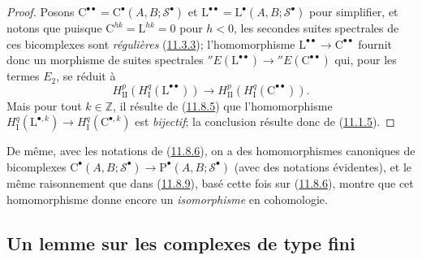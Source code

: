 \begin{proof}
Posons $\mathrm C^{\bullet\bullet}=
\mathrm C^\bullet(A,B;\mathscr S^\bullet)$ et
$\mathrm L^{\bullet\bullet}=
\mathrm L^\bullet(A,B;\mathscr S^\bullet)$ pour simplifier, et notons que
puisque $\mathrm C^{hk}=\mathrm L^{hk}=0$ pour $h<0$, les secondes suites
spectrales de ces bicomplexes sont \emph{régulières}
(\hyperref[0.11.3.3-fr]{11.3.3}); l'homomorphisme
$\mathrm L^{\bullet\bullet}\to\mathrm C^{\bullet\bullet}$ fournit donc un
morphisme de suites spectrales
${}''E(\mathrm L^{\bullet\bullet})\to
{}''E(\mathrm C^{\bullet\bullet})$
qui, pour les termes $E_2$, se réduit à
\[
\label{0.11.8.9.1-fr}
\tag{11.8.9.1}
H^p_{\mathrm{II}}(H^q_{\mathrm I}(\mathrm L^{\bullet\bullet}))
\longrightarrow
H^p_{\mathrm{II}}(H^q_{\mathrm I}(\mathrm C^{\bullet\bullet})).
\]
Mais pour tout $k\in\mathbb Z$, il résulte de
(\hyperref[0.11.8.5-fr]{11.8.5}) que l'homomorphisme
$H^q_{\mathrm I}(\mathrm L^{\bullet,k})\to
H^q_{\mathrm I}(\mathrm C^{\bullet,k})$ est \emph{bijectif}; la conclusion résulte
donc de (\hyperref[0.11.1.5-fr]{11.1.5}).
\end{proof}

\begin{env}[11.8.10]
\label{0.11.8.10-fr}
De même, avec les notations de (\hyperref[0.11.8.6-fr]{11.8.6}), on a des
homomorphismes canoniques de bicomplexes
$\mathrm C^\bullet(A,B;\mathscr S^\bullet)\to
\mathrm P^\bullet(A,B;\mathscr S^\bullet)$
(avec des notations évidentes), et le même raisonnement que dans
(\hyperref[0.11.8.9-fr]{11.8.9}), basé cette fois sur
(\hyperref[0.11.8.6-fr]{11.8.6}), montre que cet homomorphisme donne encore
un \emph{isomorphisme} en cohomologie.
\end{env}

\subsection{Un lemme sur les complexes de type fini}
\label{subsection:0.11.9-fr}

